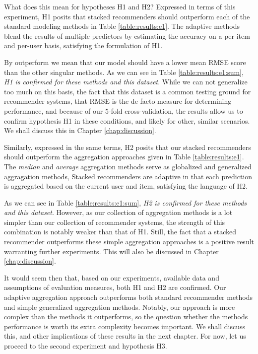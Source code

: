 What does this mean for hypotheses H1 and H2?
Expressed in terms of this experiment,
H1 posits that stacked recommenders should outperform each of the standard modeling methods
in Table \ref{table:results:e1}.
The adaptive methods blend the results of multiple predictors by estimating the accuracy
on a per-item and per-user basis, satisfying the formulation of H1.

By outperform we mean that our model should have a lower
mean RMSE score than the other singular methods. As we can see in Table \ref{table:results:e1:sum},
\emph{H1 is confirmed for these methods and this dataset}.
While we can not generalize too much on this basis, 
the fact that this dataset is a common testing ground for recommender systems,
that RMSE is the de facto measure for determining performance,
and because of our 5-fold cross-validation, the results allow us 
to confirm hypothesis H1 in these conditions, and likely for other, similar scenarios.
We shall discuss this in Chapter \ref{chap:discussion}.

Similarly, expressed in the same terms, H2 posits that 
our stacked recommenders should outperform the aggregation approaches
given in Table \ref{table:results:e1}.
The \emph{median} and \emph{average} aggregation methods
serve as globalized and generalized aggragation methods,
Stacked recommenders are adaptive in that each prediction is 
aggregated based on the current user and item,
satisfying the language of H2.

As we can see in Table \ref{table:results:e1:sum},
\emph{H2 is confirmed for these methods and this dataset}.
However, as our collection of aggregation methods is a lot simpler
than our collection of recommender systems, the strength of this combination
is notably weaker than that of H1.
Still, the fact that a stacked recommender outperforms these simple aggregation
approaches is a positive result warranting further experiments.
This will also be discussed in Chapter \ref{chap:discussion}.

It would seem then that, based on our experiments, available data
and assumptions of evaluation measures, both H1 and H2 are confirmed.
Our adaptive aggregation approach outperforms both standard recommender
methods and simple generalized aggregation methods.
Notably, our approach is more complex than the methods it outperforms,
so the question whether the methods performance is worth its extra complexity becomes important.
We shall discuss this, and other implications of these results in the next chapter.
For now, let us proceed to the second experiment and hypothesis H3.

\clearpage

